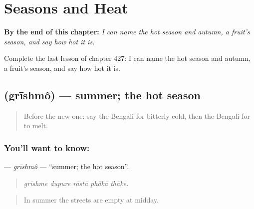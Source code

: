 
\chapter{Seasons and Heat}
\label{ch:bn-seasons-and-heat}

\begin{chapteropening}
\textbf{By the end of this chapter:} \emph{I can name the hot season and autumn, a fruit's season, and say how hot it is.}

Complete the last lesson of chapter 427: I can name the hot season and autumn, a fruit's season, and say how hot it is.
\end{chapteropening}

\section[\texorpdfstring{\bn{গ্রীষ্ম} (grīshmô)}{গ্রীষ্ম (grīshmô)}]{ (grīshmô) — summer; the hot season}

\label{lesson:BN-C427-grishmo}



\begin{quote}
Before the new one: say the Bengali for bitterly cold, then the Bengali for to melt.
\end{quote}

\subsection*{You'll want to know: }
\textbf{} — \emph{grīshmô} — \textquotedblleft{}summer; the hot season\textquotedblright{}.

\begin{quote}
    
\end{quote}

\begin{quote}
\emph{grīshme dupure rāstā phā̃kā thāke.}
\end{quote}

\begin{quote}
In summer the streets are empty at midday.
\end{quote}

